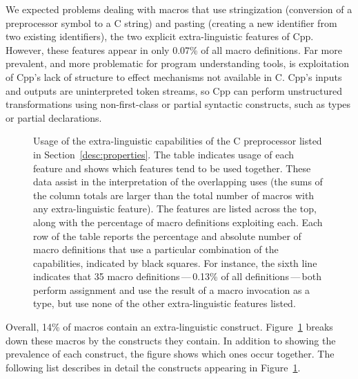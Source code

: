 \documentclass[10pt]{article}
\newcommand{\captionsmall}[1]{\caption[]{\small #1}}
\begin{document}

We expected problems dealing with macros that use stringization (conversion
of a preprocessor symbol to a C string) and pasting (creating a new
identifier from two existing identifiers), the two explicit
extra-linguistic features of Cpp.  However, these features appear in only
0.07\% of all macro definitions.  Far more prevalent, and more problematic
for program understanding tools, is exploitation of Cpp's lack of structure
to effect mechanisms not available in C\@.  Cpp's inputs and outputs are
uninterpreted token streams, so Cpp can perform unstructured transformations
using non-first-class or partial syntactic constructs, such as types or
partial declarations.

\begin{figure}
  \vspace*{.6in}
  {\small\centerline{}}
  
  \captionsmall{Usage of the extra-linguistic capabilities of the C
    preprocessor listed in Section~\ref{desc:properties}.  The table
    indicates usage of each feature and shows which features tend
    to be used together.  These data assist in the interpretation of the overlapping
    uses (the sums of the column totals are larger than the total number of
    macros with any extra-linguistic feature).
    The features are listed across the top, along with the percentage of
    macro definitions exploiting each.  Each row of the table reports the
    percentage and absolute number of macro definitions that use a particular combination
    of the capabilities, indicated by black squares.  For instance, the
    sixth line indicates that 35 macro definitions\,---\,0.13\% of all
    definitions\,---\,both perform assignment and use the result of a macro
    invocation as a type, but use none of the other extra-linguistic
    features listed.}

  \label{fig:subset-properties}
\end{figure}


Overall, 14\% of macros contain an extra-linguistic construct.
Figure~\ref{fig:subset-properties} breaks down these macros by the
constructs they contain.  In addition to showing the prevalence of each
construct, the figure shows which ones occur together.  The following list
describes in detail the constructs appearing in
Figure~\ref{fig:subset-properties}.
\end{document}
